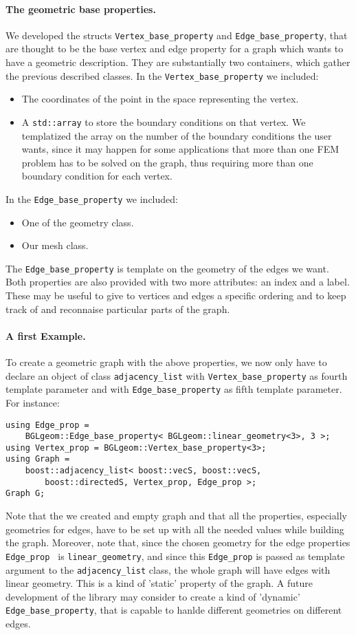 \documentclass[11pt]{article} %
\newcommand{\classname}[1]{\texttt{#1}}
\begin{document}
		\paragraph{The geometric base properties.} We developed the structs \classname{Vertex\_base\_property} and \classname{Edge\_base\_property}, that are thought to be the base vertex and edge property for a graph which wants to have a geometric description. They are substantially two containers, which gather the previous described classes.
		In the \classname{Vertex\_base\_property} we included:
		\begin{itemize}
			\item The coordinates of the point in the space representing the vertex.
			\item A \texttt{std::array} to store the boundary conditions on that vertex. We templatized the array on the number of the boundary conditions the user wants, since it may happen for some applications that more than one FEM problem has to be solved on the graph, thus requiring more than one boundary condition for each vertex.
		\end{itemize}
		In the \classname{Edge\_base\_property} we included:
		\begin{itemize}
			\item One of the geometry class.
			\item Our mesh class.
		\end{itemize}
		The \classname{Edge\_base\_property} is template on the geometry of the edges we want.
		Both properties are also provided with two more attributes: an index and a label. These may be useful to give to vertices and edges a specific ordering and to keep track of and reconnaise particular parts of the graph.
		\paragraph{A first Example.} To create a geometric graph with the above properties, we now only have to declare an object of class \classname{adjacency\_list} with \classname{Vertex\_base\_property} as fourth template parameter and with \classname{Edge\_base\_property} as fifth template parameter. For instance:
\begin{lstlisting}[frame=single]
using Edge_prop = 
	BGLgeom::Edge_base_property< BGLgeom::linear_geometry<3>, 3 >;
using Vertex_prop = BGLgeom::Vertex_base_property<3>;
using Graph = 
	boost::adjacency_list< boost::vecS, boost::vecS, 
		boost::directedS, Vertex_prop, Edge_prop >;
Graph G;
\end{lstlisting}
		Note that the we created and empty graph and that all the properties, especially geometries for edges, have to be set up with all the needed values while building the graph. Moreover, note that, since the chosen geometry for the edge properties \texttt{Edge\_prop } is \texttt{linear\_geometry}, and since this \texttt{Edge\_prop} is passed as template argument to the \classname{adjacency\_list} class, the whole graph will have edges with linear geometry. This is a kind of 'static' property of the graph. A future development of the library may consider to create a kind of 'dynamic' \texttt{Edge\_base\_property}, that is capable to hanlde different geometries on different edges. %
\end{document}
